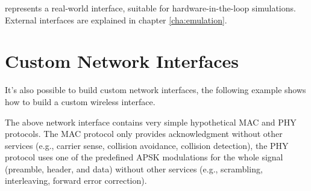  represents a real-world interface, suitable for
hardware-in-the-loop simulations. External interfaces are explained in
chapter \ref{cha:emulation}.

\section{Custom Network Interfaces}
\label{sec:interfaces:custom-network-interfaces}

It's also possible to build custom network interfaces, the following
example shows how to build a custom wireless interface.


The above network interface contains very simple hypothetical MAC and PHY
protocols. The MAC protocol only provides acknowledgment without other
services (e.g., carrier sense, collision avoidance, collision detection),
the PHY protocol uses one of the predefined APSK modulations for the whole
signal (preamble, header, and data) without other services (e.g.,
scrambling, interleaving, forward error correction).




